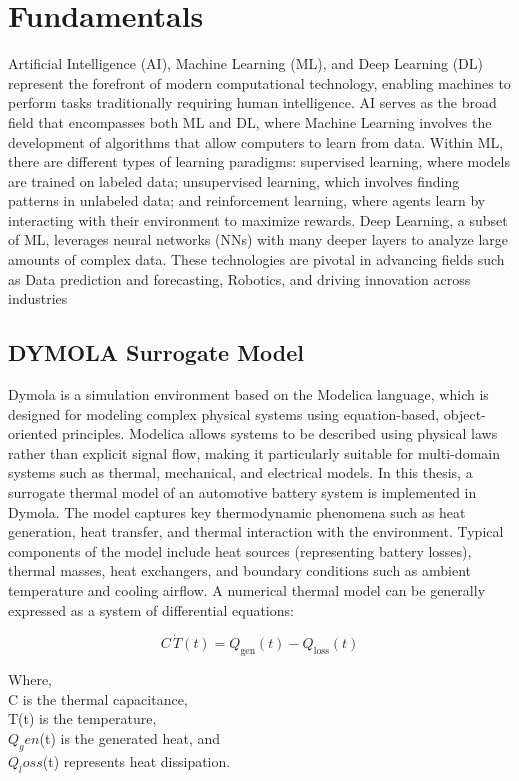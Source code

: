 \chapter{Fundamentals}
Artificial Intelligence (AI), Machine Learning (ML), and Deep Learning (DL) represent the forefront of modern computational technology, enabling machines to perform tasks traditionally requiring human intelligence. AI serves as the broad field that encompasses both ML and DL, where Machine Learning involves the development of algorithms that allow computers to learn from data. Within ML, there are different types of learning paradigms: supervised learning, where models are trained on labeled data; unsupervised learning, which involves finding patterns in unlabeled data; and reinforcement learning, where agents learn by interacting with their environment to maximize rewards. Deep Learning, a subset of ML, leverages neural networks (NNs) with many deeper layers to analyze large amounts of complex data. These technologies are pivotal in advancing fields such as Data prediction and forecasting, Robotics, and driving innovation across industries

\section{DYMOLA Surrogate Model}
Dymola is a simulation environment based on the Modelica language, which is designed for modeling complex physical systems using equation-based, object-oriented principles. Modelica allows systems to be described using physical laws rather than explicit signal flow, making it particularly suitable for multi-domain systems such as thermal, mechanical, and electrical models.
In this thesis, a surrogate thermal model of an automotive battery system is implemented in Dymola. The model captures key thermodynamic phenomena such as heat generation, heat transfer, and thermal interaction with the environment. Typical components of the model include heat sources (representing battery losses), thermal masses, heat exchangers, and boundary conditions such as ambient temperature and cooling airflow.
A numerical thermal model can be generally expressed as a system of differential equations:

\begin{equation}
C \, \dot{T}(t) = Q_{\mathrm{gen}}(t) - Q_{\mathrm{loss}}(t)
\end{equation}

Where,\\
C is the thermal capacitance,\\
T(t) is the temperature,\\
$Q_gen$(t) is the generated heat, and\\
$Q_loss$(t) represents heat dissipation.\\

